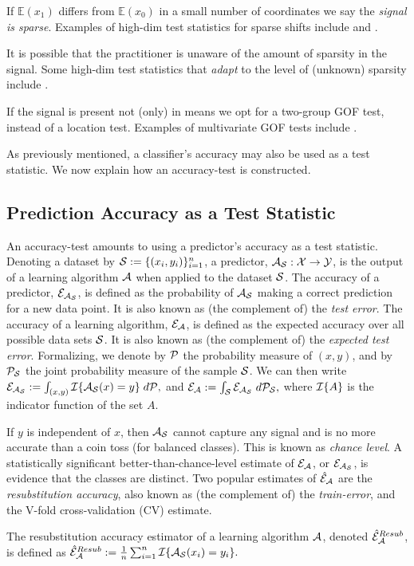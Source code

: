 \documentclass[oupdraft]{bio}
\begin{document}
If $\mathbb{E}(x_1)$ differs from $\mathbb{E}(x_0)$ in a small number of coordinates we say the \emph{signal is sparse}.
Examples of high-dim test statistics for sparse shifts include \cite{cai_two-sample_2013} and \cite{chang2014simulation}.

It is possible that the practitioner is unaware of the amount of sparsity in the signal. 
Some high-dim test statistics that \emph{adapt} to the level of (unknown) sparsity include \cite{simes1986improved,donoho2004higher,zhong2013tests,shen2015adaptive,moscovich2016exact}.

If the signal is present not (only) in means we opt for a two-group GOF test, instead of a location test. 
Examples of multivariate GOF tests include \cite{bickel1969distribution,friedman1979multivariate,hall2002permutation,szekely2004testing,Biau2005,Rosenbaum2005,eric2008testing,perez2009estimation,vayatis_auc_2009,gretton_kernel_2012-1}.

As previously mentioned, a classifier's accuracy may also be used as a test statistic. 
We now explain how an accuracy-test is constructed. 


\subsection{Prediction Accuracy as a Test Statistic}
An accuracy-test amounts to using a predictor's accuracy as a test statistic.  
Denoting a dataset by $\mathcal{S}:=\{(x_i,y_i)\}_{i=1}^n$, a predictor, $\mathcal{A}_{\mathcal{S}}:\mathcal{X} \to \mathcal{Y}$, is the output of a learning algorithm $\mathcal{A}$ when applied to the dataset $\mathcal{S}$. 
The accuracy of a predictor, $\mathcal{E}_{\mathcal{A}_{\mathcal{S}}}$, is defined as the probability of $\mathcal{A}_{\mathcal{S}}$ making a correct prediction for a new data point. 
It is also known as (the complement of) the \emph{test error}.
The accuracy of a learning algorithm, $\mathcal{E}_{\mathcal{A}}$, is defined as the expected accuracy over all possible data sets $\mathcal{S}$. 
It is also known as (the complement of) the \emph{expected test error}.
Formalizing, we denote by $\mathcal{P}$ the probability measure of $(x, y)$, and by $\mathcal{P}_{\mathcal{S}}$ the joint probability measure of the sample $\mathcal{S}$. 
We can then write $\mathcal{E}_{\mathcal{A}_{\mathcal{S}}}:=\int_{(x,y)} \mathcal{I}{\{ \mathcal{A}_{\mathcal{S}}(x)=y \}} \; d\mathcal{P},$
and
$\mathcal{E}_{\mathcal{A}}:=\int_{\mathcal{S}} \mathcal{E}_{\mathcal{A}_{\mathcal{S}}} \; d\mathcal{P}_{\mathcal{S}},$
where $\mathcal{I}{\{ A \}}$ is the indicator function of the set $A$. 

If $y$ is independent of $x$, then $\mathcal{A}_{\mathcal{S}}$ cannot capture any signal and is no more accurate than a coin toss (for balanced classes). 
This is known as \emph{chance level}.
A statistically significant better-than-chance-level estimate of $\mathcal{E}_{\mathcal{A}}$, or $\mathcal{E}_{\mathcal{A}_{\mathcal{S}}}$, is evidence that the classes are distinct. 
Two popular estimates of $\hat{\mathcal{E}}_{\mathcal{A}}$ are the \emph{resubstitution accuracy}, also known as (the complement of) the \emph{train-error}, and the V-fold cross-validation (CV) estimate.
\begin{definition}
	\label{def:resubstitution}
	The resubstitution accuracy estimator of a learning algorithm $\mathcal{A}$, denoted $\hat{\mathcal{E}}_{\mathcal{A}}^{Resub}$,  is defined as
	$\hat{\mathcal{E}}_{\mathcal{A}}^{Resub} := \frac 1n \sum_{i=1}^{n} \mathcal{I}{\{ \mathcal{A}_{\mathcal{S}}(x_i)=y_i \}}.$
\end{definition}
\end{document}
